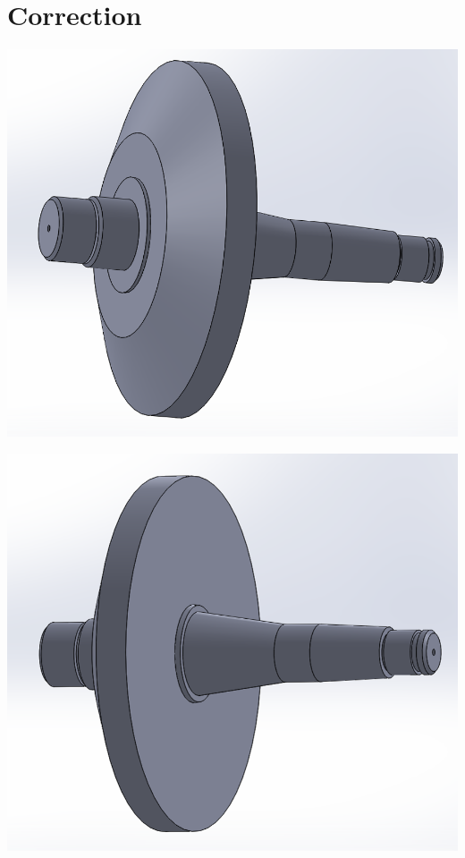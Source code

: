 

\ifdef{\public}{}{}

\newpage

\pagestyle{correction}

\section{Correction}



\includegraphics[width=0.8\linewidth]{img/Piece5/Piece5_1.png}

\includegraphics[width=0.8\linewidth]{img/Piece5/Piece5_2.png}









